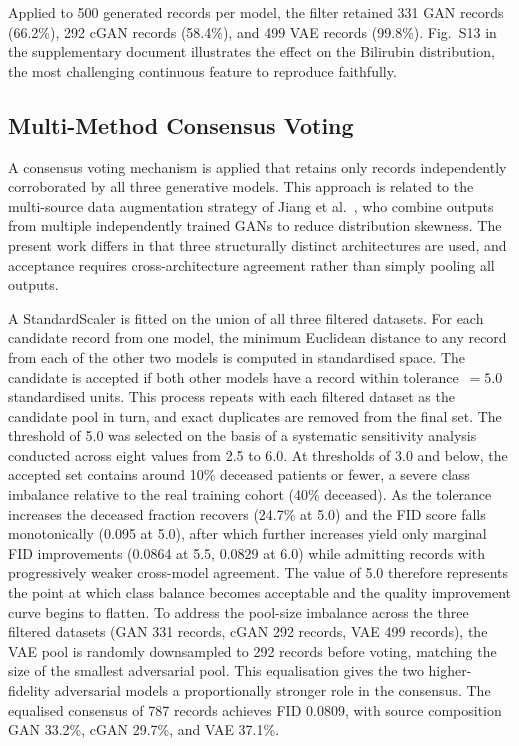 \documentclass[journal]{IEEEtran}
\begin{document}
Applied to 500 generated records per model, the filter retained 331 GAN records (66.2\%), 292 cGAN records (58.4\%), and 499 VAE records (99.8\%). Fig.~S13 in the supplementary document illustrates the effect on the Bilirubin distribution, the most challenging continuous feature to reproduce faithfully.

\subsection{Multi-Method Consensus Voting}

A consensus voting mechanism is applied that retains only records independently corroborated by all three generative models. This approach is related to the multi-source data augmentation strategy of Jiang et al.\ \cite{jiang2023}, who combine outputs from multiple independently trained GANs to reduce distribution skewness. The present work differs in that three structurally distinct architectures are used, and acceptance requires cross-architecture agreement rather than simply pooling all outputs.

A StandardScaler is fitted on the union of all three filtered datasets. For each candidate record from one model, the minimum Euclidean distance to any record from each of the other two models is computed in standardised space. The candidate is accepted if both other models have a record within tolerance~$= 5.0$ standardised units. This process repeats with each filtered dataset as the candidate pool in turn, and exact duplicates are removed from the final set. The threshold of 5.0 was selected on the basis of a systematic sensitivity analysis conducted across eight values from 2.5 to 6.0. At thresholds of 3.0 and below, the accepted set contains around 10\% deceased patients or fewer, a severe class imbalance relative to the real training cohort (40\% deceased). As the tolerance increases the deceased fraction recovers (24.7\% at 5.0) and the FID score falls monotonically (0.095 at 5.0), after which further increases yield only marginal FID improvements (0.0864 at 5.5, 0.0829 at 6.0) while admitting records with progressively weaker cross-model agreement. The value of 5.0 therefore represents the point at which class balance becomes acceptable and the quality improvement curve begins to flatten. To address the pool-size imbalance across the three filtered datasets (GAN 331 records, cGAN 292 records, VAE 499 records), the VAE pool is randomly downsampled to 292 records before voting, matching the size of the smallest adversarial pool. This equalisation gives the two higher-fidelity adversarial models a proportionally stronger role in the consensus. The equalised consensus of 787 records achieves FID 0.0809, with source composition GAN 33.2\%, cGAN 29.7\%, and VAE 37.1\%.
\end{document}

